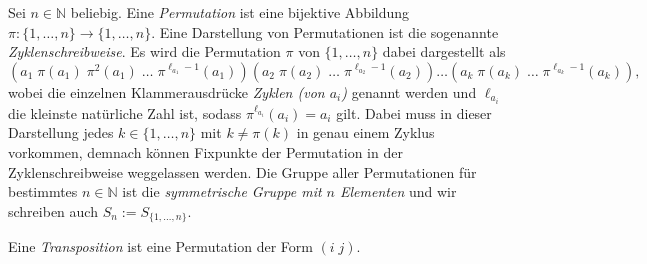 \begin{definition}
    Sei $n\in\mathbb{N}$ beliebig. Eine \emph{Permutation} ist eine bijektive Abbildung $\pi: \{1, \ldots, n\} \to \{1, \ldots, n\}$. Eine Darstellung von Permutationen ist die sogenannte \emph{Zyklenschreibweise}. Es wird die Permutation $\pi$ von $\{ 1, \hdots, n \}$ dabei dargestellt als
    $$ (a_1\; \pi(a_1)\; \pi^2(a_1)\; \ldots \; \pi^{\ell_{a_1} - 1}(a_1)) (a_2\; \pi(a_2)\; \ldots \; \pi^{\ell_{a_2} - 1}(a_2)) \ldots (a_k\; \pi(a_k)\; \ldots \; \pi^{\ell_{a_k} - 1}(a_k)),$$
    wobei die einzelnen Klammerausdrücke \emph{Zyklen (von $a_i$)} genannt werden und $\ell_{a_i}$ die kleinste natürliche Zahl ist, sodass $\pi^{\ell_{a_i}}(a_i) = a_i$ gilt. Dabei muss in dieser Darstellung jedes $k \in \{ 1, \hdots, n \}$ mit $k \neq \pi(k)$ in genau einem Zyklus vorkommen, demnach können Fixpunkte der Permutation in der Zyklenschreibweise weggelassen werden.
    Die Gruppe aller Permutationen für bestimmtes $n \in \mathbb{N}$ ist die \emph{symmetrische Gruppe mit $n$ Elementen} und wir schreiben auch $S_n := S_{\{1,\ldots, n\}}$.

    Eine \emph{Transposition} ist eine Permutation der Form $(i\; j)$.
\end{definition}

